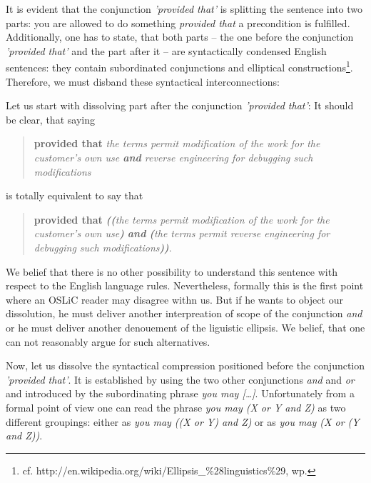 It is evident that the conjunction \emph{'provided that'} is splitting the
sentence into two parts: you are allowed to do something \emph{provided that} a
precondition is fulfilled. Additionally, one has to state, that both parts --
the one before the conjunction \emph{'provided that'} and the part after it --
are syntactically condensed English sentences: they contain subordinated 
conjunctions and elliptical constructions\footnote{cf.
http://en.wikipedia.org/wiki/Ellipsis\_\%28linguistics\%29, wp.
}. Therefore, we must disband these syntactical interconnections:

Let us start with dissolving part after the conjunction \emph{'provided that'}:
It should be clear, that saying

\begin{quote}\noindent\textbf{provided that} \emph{the terms permit modification
of the work for the customer's own use \emph{\textbf{and}} reverse engineering
for debugging such modifications}\end{quote}

is totally equivalent to say that 

\begin{quote}\noindent[\ldots] \textbf{provided that} \emph{\textbf{((}the terms
permit modification of the work for the customer's own use\textbf{)}
\emph{\textbf{and}} \textbf{(}the terms permit reverse engineering for debugging
such modifications\textbf{))}}.
\end{quote}

We belief that there is no other possibility to understand this sentence with
respect to the English language rules. Nevertheless, formally this is the first
point where an OSLiC reader may disagree withn us. But if he wants to object our
dissolution, he must deliver another interpreation of scope of the
conjunction \emph{and} or he must deliver another denouement of the liguistic
ellipsis. We belief, that one can not reasonably argue for such alternatives.

Now, let us dissolve the syntactical compression positioned before the
conjunction \emph{'provided that'}. It is established by using the two other
conjunctions \emph{and} and \emph{or} and introduced by the subordinating phrase
\emph{you may [\ldots]}. Unfortunately from a formal point of view one can read
the phrase \emph{you may (X or Y and Z)} as two different groupings: either as
\emph{you may ((X or Y) and Z)} or as \emph{you may (X or (Y and Z))}. 


